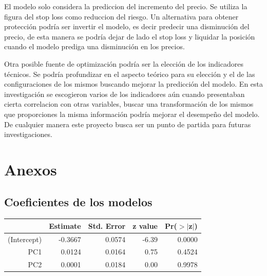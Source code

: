 \documentclass[a4paper,12pt]{Latex/Classes/PhDthesisPSnPDF}
\begin{document}
El modelo solo considera la prediccion del incremento del precio. Se utiliza la figura del stop loss como reduccion del riesgo. Un alternativa para obtener protección podría ser invertir el modelo, es decir predecir una disminución del precio, de esta manera se podría dejar de lado el stop loss y liquidar la posición cuando el modelo prediga una disminución en los precios.

Otra posible fuente de optimización podría ser la elección de los indicadores técnicos. Se podría profundizar en el aspecto teórico para su elección y el de las configuraciones de los mismos buscando mejorar la predicción del modelo. En esta investigación se escogieron varios de los indicadores aún cuando presentaban cierta correlacion con otras variables, buscar una transformación de los mismos que proporciones la misma información podría mejorar el desempeño del modelo. De cualquier manera este proyecto busca ser un punto de partida para futuras investigaciones.


\chapter{Anexos}

\section{Coeficientes de los modelos}

\begin{center}
\begin{table}[ht]
\centering
\begin{tabular}{rrrrr}
  \hline
 & Estimate & Std. Error & z value & Pr($>$$|$z$|$) \\ 
  \hline
(Intercept) & -0.3667 & 0.0574 & -6.39 & 0.0000 \\ 
  PC1 & 0.0124 & 0.0164 & 0.75 & 0.4524 \\ 
  PC2 & 0.0001 & 0.0184 & 0.00 & 0.9978 \\ 
   \hline
\end{tabular}
\end{table}\end{center}
\end{document}

